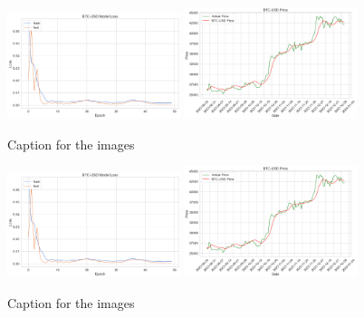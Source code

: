 \documentclass{ledger}
\begin{document}
\begin{figure}[htbp]
    \centering
    \includegraphics[width=0.45\textwidth]{code/price-prediction/lstm/images/btc_usd_loss.png} %
    \hspace{0.05\textwidth} %
    \includegraphics[width=0.45\textwidth]{code/price-prediction/lstm/images/btc_usd_price.png} %
    \caption{Caption for the images}
    \label{fig:side_by_side}
\end{figure}

\begin{figure}[htbp]
    \centering
    \includegraphics[width=0.45\textwidth]{code/price-prediction/lstm/images/btc_usd_loss.png} %
    \hspace{0.05\textwidth} %
    \includegraphics[width=0.45\textwidth]{code/price-prediction/lstm/images/btc_usd_price.png} %
    \caption{Caption for the images}
    \label{fig:side_by_side}
\end{figure}


\thispagestyle{pagelast}

\end{document}
